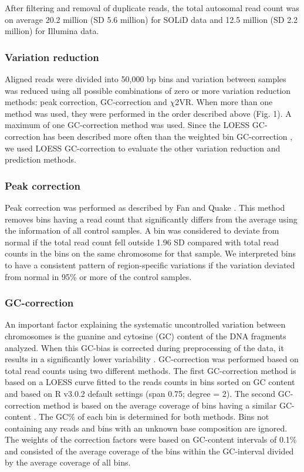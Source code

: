 After filtering and removal of duplicate reads, the total autosomal read count was on average 20.2 million (SD 5.6 million) for SOLiD data and 12.5 million (SD 2.2 million) for Illumina data.

\subsubsection{Variation reduction}
Aligned reads were divided into 50,000 bp bins and variation between samples was reduced using all possible combinations of zero or more variation reduction methods: peak correction, GC-correction and $\chi$2VR. 
When more than one method was used, they were performed in the order described above (Fig. 1). 
A maximum of one GC-correction method was used. Since the LOESS GC-correction has been described more often \cite{Chen_2011,Lau_2012,Palomaki_2012,Liang_2013} than the weighted bin GC-correction \cite{Fan_2010}, we used LOESS GC-correction to evaluate the other variation reduction and prediction methods.

\subsubsection{Peak correction}
Peak correction was performed as described by Fan and Quake \cite{Fan_2010}. 
This method removes bins having a read count that significantly differs from the average using the information of all control samples. 
A bin was considered to deviate from normal if the total read count fell outside 1.96 SD compared with total read counts in the bins on the same chromosome for that sample. 
We interpreted bins to have a consistent pattern of region-specific variations if the variation deviated from normal in 95\% or more of the control samples.

\subsubsection{GC-correction}
An important factor explaining the systematic uncontrolled variation between chromosomes is the guanine and cytosine (GC) content of the DNA fragments analyzed. 
When this GC-bias is corrected during preprocessing of the data, it results in a significantly lower variability \cite{Liang_2013}. 
GC-correction was performed based on total read counts using two different methods. 
The first GC-correction method is based on a LOESS curve fitted to the reads counts in bins sorted on GC content \cite{Chen_2011,Lau_2012,Palomaki_2012,Liang_2013} and based on R v3.0.2 default settings (span 0.75; degree = 2). 
The second GC-correction method is based on the average coverage of bins having a similar GC-content \cite{Fan_2010}. 
The GC\% of each bin is determined for both methods. Bins not containing any reads and bins with an unknown base composition are ignored. 
The weights of the correction factors were based on GC-content intervals of 0.1\% and consisted of the average coverage of the bins within the GC-interval divided by the average coverage of all bins.


